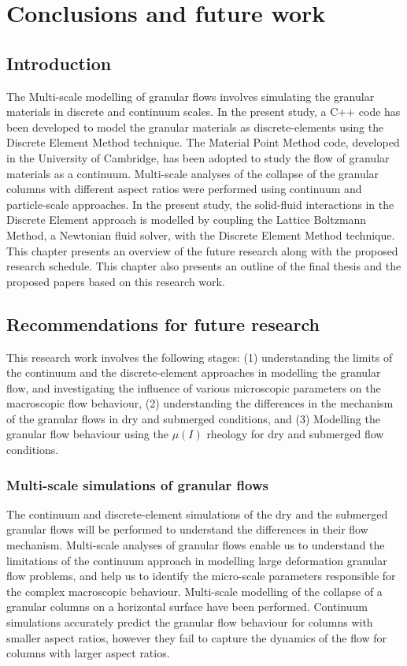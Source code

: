 \chapter{Conclusions and future work}

\ifpdf
    \graphicspath{{Chapter7/figs/raster/}{Chapter7/figs/pdf/}{Chapter7/figs/}}
\else
    \graphicspath{{Chapter7/figs/vector/}{Chapter7/figs/}}
\fi
\section{Introduction}
The Multi-scale modelling of granular flows involves simulating the granular 
materials in discrete and continuum scales. In the present study, a C++ code 
has been developed to model the granular materials as discrete-elements using 
the Discrete Element Method technique. The Material Point Method code, 
developed in the University of Cambridge, has been adopted to 
study the flow of granular materials as a continuum. Multi-scale analyses 
of the collapse of the granular columns with different aspect ratios were 
performed using continuum and particle-scale approaches. In the present study, 
the solid-fluid interactions in the Discrete Element approach is modelled by 
coupling the Lattice Boltzmann Method, a Newtonian fluid solver, with the 
Discrete Element Method technique. This chapter presents an overview of the 
future research along with the proposed research schedule. This chapter also 
presents an outline of the final thesis and the proposed 
papers based on this research 
work. 


\section{Recommendations for future research}
This research work involves the following stages: (1) understanding the limits 
of the continuum and the discrete-element approaches in modelling the granular 
flow, and investigating the influence of various microscopic parameters on the 
macroscopic flow behaviour, (2) understanding the 
differences in the mechanism of the granular flows in dry and submerged 
conditions, and (3) Modelling the granular flow behaviour using the $\mu(I)$ 
rheology for dry and submerged flow conditions.

\subsection{Multi-scale simulations of granular flows}
The continuum and discrete-element simulations of the dry and the submerged 
granular flows will be performed to understand the differences in their flow 
mechanism. Multi-scale analyses of granular flows enable us to understand the 
limitations of the continuum approach in modelling large deformation granular 
flow problems, and help us to identify the micro-scale parameters responsible 
for the complex macroscopic behaviour. Multi-scale modelling of the collapse of 
a granular columns on a horizontal surface have been performed. Continuum 
simulations accurately predict the granular flow behaviour for columns with 
smaller aspect ratios, however they fail to capture the dynamics of the flow 
for columns with larger aspect ratios. 

